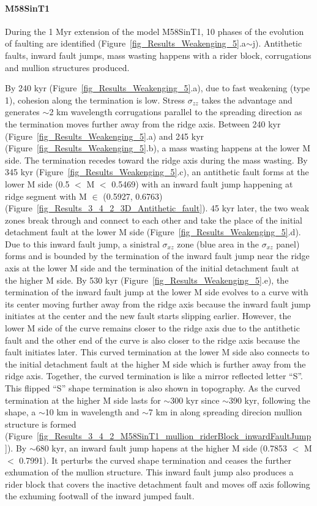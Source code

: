\documentclass[draft,gc]{agutex}
\begin{document}
\begin{article}
\paragraph{M58SinT1}\label{para_M58SinT1}
During the 1 Myr extension of the model M58SinT1, 10 phases of the evolution of faulting are identified (Figure~\ref{fig_Results_Weakenging_5}.a$\sim$j). Antithetic faults, inward fault jumps, mass wasting happens with a rider block, corrugations and mullion structures produced.

By 240 kyr (Figure~\ref{fig_Results_Weakenging_5}.a), due to fast weakening (type 1), cohesion along the termination is low. Stress $\sigma_{zz}$ takes the advantage and generates $\sim$2 km wavelength corrugations parallel to the spreading direction as the termination moves further away from the ridge axis. Between 240 kyr (Figure~\ref{fig_Results_Weakenging_5}.a) and 245 kyr (Figure~\ref{fig_Results_Weakenging_5}.b), a mass wasting happens at the lower M side. The termination recedes toward the ridge axis during the mass wasting. By 345 kyr (Figure~\ref{fig_Results_Weakenging_5}.c), an antithetic fault forms at the lower M side (0.5 $<$ M $<$ 0.5469) with an inward fault jump happening at ridge segment with M $\in$ (0.5927, 0.6763) (Figure~\ref{fig_Results_3_4_2_3D_Antithetic_fault}). 45 kyr later, the two weak zones break through and connect to each other and take the place of the initial detachment fault at the lower M side (Figure~\ref{fig_Results_Weakenging_5}.d). Due to this inward fault jump, a sinistral $\sigma_{xz}$ zone (blue area in the $\sigma_{xz}$ panel) forms and is bounded by the termination of the inward fault jump near the ridge axis at the lower M side and the termination of the initial detachment fault at the higher M side. By 530 kyr (Figure~\ref{fig_Results_Weakenging_5}.e), the termination of the inward fault jump at the lower M side evolves to a curve with its center moving further away from the ridge axis because the inward fault jump initiates at the center and the new fault starts slipping earlier. However, the lower M side of the curve remains closer to the ridge axis due to the antithetic fault and the other end of the curve is also closer to the ridge axis because the fault initiates later. This curved termination at the lower M side also connects to the initial detachment fault at the higher M side which is further away from the ridge axis. Together, the curved termination is like a mirror reflected letter ``S''. This flipped ``S'' shape termination is also shown in topography. As the curved termination at the higher M side lasts for $\sim$300 kyr since $\sim$390 kyr, following the shape, a $\sim$10 km in wavelength and $\sim$7 km in along spreading direcion mullion structure is formed (Figure~\ref{fig_Results_3_4_2_M58SinT1_mullion_riderBlock_inwardFaultJump}). By $\sim$680 kyr, an inward fault jump hapens at the higher M side (0.7853 $<$ M $<$ 0.7991). It perturbs the curved shape termination and ceases the further exhumation of the mullion structure. This inward fault jump also produces a rider block that covers the inactive detachment fault and moves off axis following the exhuming footwall of the inward jumped fault.


\end{article}
\end{document}
